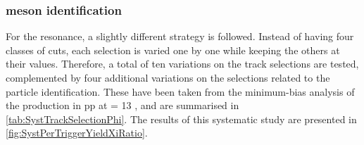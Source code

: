 %    
%    

\subsubsection{\rmPhiMes meson identification}

For the \rmPhiMes resonance, a slightly different strategy is followed. Instead of having four classes of cuts, each selection is varied one by one while keeping the others at their values. Therefore, a total of ten variations on the track selections are tested, complemented by four additional variations on the selections related to the particle identification. These have been taken from the minimum-bias analysis of the \rmPhiMes production in pp at \sqrtS = 13 \tev \cite{alicecollaborationMultiplicityDependenceK2019}, and are summarised in \tab\ref{tab:SystTrackSelectionPhi}. The results of this systematic study are presented in \figs\ref{fig:SystPerTriggerYieldXiRatio}.

